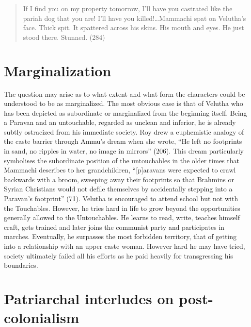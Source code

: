 \begin{quote}
  If I find you on my property tomorrow, I’ll have you castrated like the pariah dog that you are! I’ll have you killed!\ldots Mammachi spat on Velutha’s face. Thick spit. It spattered across his skins. His mouth and eyes. He just stood there. Stunned. (284)
\end{quote}

\section{Marginalization}

The question may arise as to what extent and what form the characters could be understood to be as marginalized. The most obvious case is that of Velutha who has been depicted as subordinate or marginalized from the beginning itself. Being a Paravan and an untouchable, regarded as unclean and inferior, he is already subtly ostracized from his immediate society. Roy drew a euphemistic analogy of the caste barrier through Ammu’s dream when she wrote, “He left no footprints in sand, no ripples in water, no image in mirrors” (206). This dream particularly symbolises the subordinate position of the untouchables in the older times that Mammachi describes to her grandchildren,  “[p]aravans were expected to crawl backwards with a broom, sweeping away their footprints so that Brahmins or Syrian Christians would not defile themselves by accidentally stepping into a Paravan’s footprint” (71). Velutha is encouraged to attend school but not with the Touchables. However, he tries hard in life to grow beyond the opportunities generally allowed to the Untouchables. He learns to read, write, teaches himself craft, gets trained and later joins the communist party and participates in marches. Eventually, he surpasses the most forbidden territory, that of getting into a relationship with an upper caste woman. However hard he may have tried, society ultimately failed all his efforts as he paid heavily for transgressing his boundaries. 

\section{Patriarchal interludes on post-colonialism}

